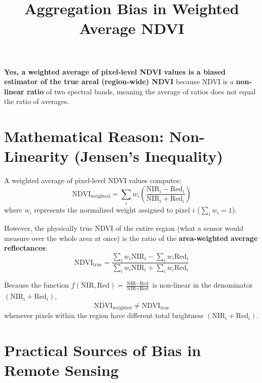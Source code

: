 \documentclass[11pt,a4paper]{article}
\title{Aggregation Bias in Weighted Average NDVI}
\author{}
\date{}
\begin{document}
\maketitle

\noindent\textbf{Yes, a weighted average of pixel-level NDVI values is a biased estimator of the true areal (region-wide) NDVI} because NDVI is a \textbf{non-linear ratio} of two spectral bands, meaning the average of ratios does not equal the ratio of averages.

\section{Mathematical Reason: Non-Linearity (Jensen's Inequality)}

A weighted average of pixel-level NDVI values computes:
\begin{equation}
\overline{\text{NDVI}}_{\text{weighted}} = \sum_{i} w_i \left(\frac{\text{NIR}_i - \text{Red}_i}{\text{NIR}_i + \text{Red}_i}\right)
\end{equation}
where $w_i$ represents the normalized weight assigned to pixel $i$ ($\sum_i w_i = 1$).

However, the physically true NDVI of the entire region (what a sensor would measure over the whole area at once) is the ratio of the \textbf{area-weighted average reflectances}:
\begin{equation}
\text{NDVI}_{\text{true}} = \frac{\sum_{i} w_i \text{NIR}_i - \sum_{i} w_i \text{Red}_i}{\sum_{i} w_i \text{NIR}_i + \sum_{i} w_i \text{Red}_i}
\end{equation}

Because the function $f(\text{NIR}, \text{Red}) = \frac{\text{NIR} - \text{Red}}{\text{NIR} + \text{Red}}$ is non-linear in the denominator $(\text{NIR}_i + \text{Red}_i)$,
\begin{equation}
\overline{\text{NDVI}}_{\text{weighted}} \neq \text{NDVI}_{\text{true}}
\end{equation}
whenever pixels within the region have different total brightness $(\text{NIR}_i + \text{Red}_i)$.

\section{Practical Sources of Bias in Remote Sensing}
\end{document}
